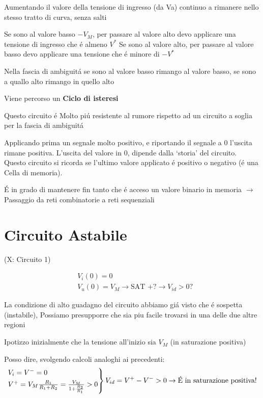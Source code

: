 \documentclass{article}
\begin{document}
Aumentando il valore della tensione di ingresso (da Va) continuo a rimanere nello stesso tratto di curva, senza salti

Se sono al valore basso $-V_M$, per passare al valore alto devo applicare una tensione di ingresso che \'e almeno $V^*$
Se sono al valore alto, per passare al valore basso devo applicare una tensione che \'e minore di $-V^*$

Nella fascia di ambiguit\'a se sono al valore basso rimango al valore basso, se sono a quallo alto rimango in quello alto

Viene percorso un \textbf{Ciclo di isteresi}

Questo circuito \'e Molto pi\'u resistente al rumore rispetto ad un circuito a soglia per la fascia di ambiguit\'a

Applicando prima un segnale molto positivo, e riportando il segnale a 0 l'uscita rimane positiva. L'uscita del valore in 0, dipende dalla `storia' del circuito. Questo circuito si ricorda se l'ultimo valore applicato \'e positivo o negativo (\'e una Cella di memoria).

\'E in grado di mantenere fin tanto che \'e acceso un valore binario in memoria $\rightarrow$ Passaggio da reti combinatorie a reti sequenziali

\newpage
\section{Circuito Astabile}

\begin{circuitikz}

\end{circuitikz}
(X: Circuito 1)

\[
    \begin{split}
        &V_i(0) = 0\\
        &V_u(0) = V_M \rightarrow \text{SAT +?} \rightarrow V_{id} > 0 \text{?}
    \end{split}
\]

La condizione di alto guadagno del circuito abbiamo gi\'a visto che \'e sospetta (instabile), Possiamo presupporre che sia piu facile trovarsi in una delle due altre regioni

Ipotizzo inizialmente che la tensione all'inizio sia $V_M$ (in saturazione positiva)

Posso dire, svolgendo calcoli analoghi ai precedenti:
\[
    \begin{rcases}
        V_i = V^- = 0\\
        V^+ = V_M \frac{R_1}{R_1 + R_2} = \frac{V_M}{1 + \frac{R_2}{R_1}} > 0
    \end{rcases} V_{id} = V^+ - V^- > 0 \rightarrow \text{\'E in saturazione positiva!}
\]
\end{document}
